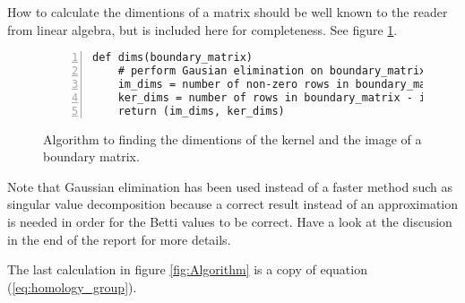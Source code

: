 \documentclass[11pt,a4paper,twoside]{report}
\begin{document}
How to calculate the dimentions of a matrix should be well known to the reader from linear algebra, but is included here for completeness. See figure \ref{fig:Algorithm_dims}.
\begin{figure}[H]
\begin{lstlisting}[numbers=left]
def dims(boundary_matrix)
    # perform Gausian elimination on boundary_matrix
    im_dims = number of non-zero rows in boundary_matrix
    ker_dims = number of rows in boundary_matrix - im_dims
    return (im_dims, ker_dims)
\end{lstlisting}
\caption{Algorithm to finding the dimentions of the kernel and the image of a boundary matrix.}
\label{fig:Algorithm_dims}
\end{figure}
Note that Gaussian elimination has been used instead of a faster method such as singular value decomposition because a correct result instead of an approximation is needed in order for the Betti values to be correct. Have a look at the discusion in the end of the report for more details.

The last calculation in figure \ref{fig:Algorithm} is a copy of equation (\ref{eq:homology_group}).
\end{document}
